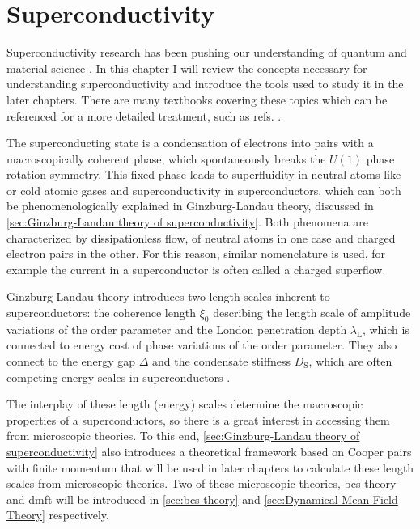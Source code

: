 \documentclass[../main.tex]{subfiles}
\begin{document}
\chapter{Superconductivity}\label{ch:superconductivity}

Superconductivity research has been pushing our understanding of quantum and material science \cite{keimerPhysicsQuantumMaterials2017}.
In this chapter I will review the concepts necessary for understanding superconductivity and introduce the tools used to study it in the later chapters.
There are many textbooks covering these topics which can be referenced for a more detailed treatment, such as refs. \cite{colemanIntroductionManyBodyPhysics2015, tinkhamIntroductionSuperconductivity1996, bruusManyBodyQuantumTheory2004, larkinTheoryFluctuationsSuperconductors2005, bennemannSuperconductivity2008}.

The superconducting state is a condensation of electrons into pairs with a macroscopically coherent phase, which spontaneously breaks the \(U(1)\) phase rotation symmetry.
This fixed phase leads to superfluidity in neutral atoms like  or cold atomic gases and superconductivity in superconductors, which can both be phenomenologically explained in Ginzburg-Landau theory, discussed in \cref{sec:Ginzburg-Landau theory of superconductivity}.
Both phenomena are characterized by dissipationless flow, of neutral atoms in one case and charged electron pairs in the other.
For this reason, similar nomenclature is used, for example the current in a superconductor is often called a charged superflow.

Ginzburg-Landau theory introduces two length scales inherent to superconductors: the coherence length \(\xi_0\) describing the length scale of amplitude variations of the order parameter and the London penetration depth \(\lambda_{\mathrm{L}}\), which is connected to energy cost of phase variations of the order parameter.
They also connect to the energy gap \(\Delta\) and the condensate stiffness \(D_{\mathrm{S}}\), which are often competing energy scales in superconductors \cite{emeryImportancePhaseFluctuations1995, kivelsonMakingHighTc2002}.

The interplay of these length (energy) scales determine the macroscopic properties of a superconductors, so there is a great interest in accessing them from microscopic theories.
To this end, \cref{sec:Ginzburg-Landau theory of superconductivity} also introduces a theoretical framework based on Cooper pairs with finite momentum \cite{wittBypassingLatticeBCS2024} that will be used in later chapters to calculate these length scales from microscopic theories.
Two of these microscopic theories, \gls{bcs} theory and \gls{dmft} will be introduced in \cref{sec:bcs-theory} and \cref{sec:Dynamical Mean-Field Theory} respectively.
\end{document}
